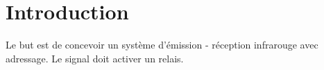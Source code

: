 \newpage
\section{Introduction}
Le but est de concevoir un système d'émission - réception infrarouge avec adressage. Le signal doit activer un relais. 
